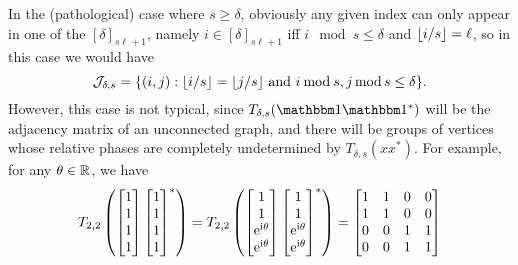 In the (pathological) case where $s \ge \delta$, obviously any given index can only appear in one of the $[\delta]_{s \ell + 1}$, namely $i \in [\delta]_{s \ell + 1}$ iff $i \mod s \le \delta$ and $\lfloor i / s\rfloor = \ell$, so in this case we would have \[\mathcal{J}_{\delta, s} = \{(i, j) : \lfloor i / s\rfloor = \lfloor j / s\rfloor \ \text{and} \ i \mathbin{\mathrm{mod}} s, j \operatorname{\mathbin{mod}} s \le \delta\}.\]  However, this case is not typical, since $T_{\delta, s}(\one \one^*)$ will be the adjacency matrix of an unconnected graph, and there will be groups of vertices whose relative phases are completely undetermined by $T_{\delta, s}(x x^*)$.  For example, for any $\theta \in \mathbb{R}$, we have \[T_{2, 2}\left(\begin{bmatrix} 1 \\ 1 \\ 1 \\ 1 \end{bmatrix} \begin{bmatrix} 1 \\ 1 \\ 1 \\ 1 \end{bmatrix}^*\right) = T_{2, 2}\left(\begin{bmatrix} 1 \\ 1 \\ \mathrm{e}^{\mathrm{i} \theta} \\ \mathrm{e}^{\mathrm{i} \theta} \end{bmatrix} \begin{bmatrix} 1 \\ 1 \\ \mathrm{e}^{\mathrm{i} \theta} \\ \mathrm{e}^{\mathrm{i} \theta} \end{bmatrix}^*\right) = \begin{bmatrix} 1 & 1 & 0 & 0 \\ 1 & 1 & 0 & 0 \\ 0 & 0 & 1 & 1 \\ 0 & 0 & 1 & 1 \end{bmatrix} \] %

